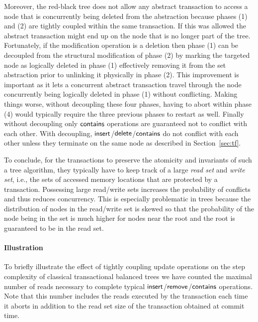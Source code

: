 Moreover, the red-black tree does not allow any abstract transaction to access a node that is concurrently being deleted from the abstraction because
phases (1) and (2) are tightly coupled within the same transaction.
If this was allowed the abstract transaction might end up on the node that is no longer part of the tree.
Fortunately, if the modification operation is a deletion then phase (1) can be decoupled from the structural modification of phase (2)
by marking the targeted node as logically deleted in phase (1) effectively removing it from the set abstraction prior to unlinking it physically in phase (2).
This improvement is important as it lets a concurrent abstract transaction travel through the node concurrently being logically deleted in phase (1) without conflicting.
Making things worse, without decoupling these four phases, having to abort within phase (4) would typically require the three previous phases 
to restart as well. 
Finally without decoupling only $\act{contains}$ operations are guaranteed not to conflict with each other.
With decoupling, $\act{insert}$/$\act{delete}$/$\act{contains}$ do not conflict with each other unless they terminate on the same node as described in Section~\ref{sec:tf}.

To conclude, for the transactions to preserve the atomicity and invariants of such a tree algorithm, they typically have to 
keep track of a large \emph{read set} and \emph{write set}, 
i.e., the sets of accessed memory locations that are protected by a transaction. 
Possessing large read/write sets increases the probability of conflicts and thus reduces concurrency.
This is especially problematic
in trees because the distribution of nodes in the read/write set is skewed so that the probability of the node being in the set is much higher for nodes near the root and the root is guaranteed to be in the read set.

\paragraph{Illustration}

To briefly illustrate the effect of tightly coupling update operations on the step complexity of classical transactional balanced trees
we have counted the maximal number of reads necessary to complete typical $\lit{insert}$/$\lit{remove}$/$\lit{contains}$ operations.
Note that this number includes the reads executed by the transaction each time it aborts in addition to the read set size of the transaction obtained at commit time.

